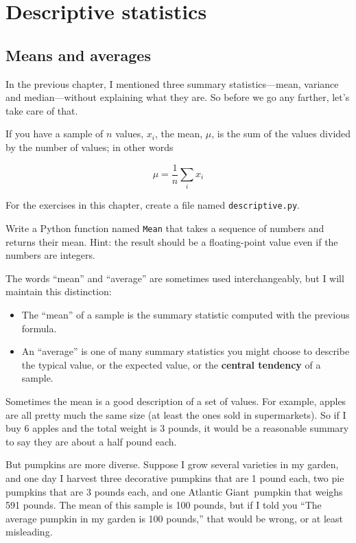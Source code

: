 \documentclass[10pt]{book}
\begin{document}
\chapter{Descriptive statistics}

\section{Means and averages}

In the previous chapter, I mentioned three summary statistics---mean,
variance and median---without explaining what they are.  So before
we go any farther, let's take care of that.

If you have a sample of $n$ values, $x_i$, the mean, $\mu$, is
the sum of the values divided by the number of values; in other words

\[ \mu = \frac{1}{n} \sum_i x_i \]

\begin{ex}
For the exercises in this chapter, create a file named {\tt descriptive.py}.

Write a Python function named {\tt Mean} that takes a sequence 
of numbers and returns their mean.  Hint: the result should
be a floating-point value even if the numbers are integers.
\end{ex}

The words ``mean'' and ``average'' are sometimes used interchangeably,
but I will maintain this distinction:

\begin{itemize}

\item The ``mean'' of a sample is the summary statistic computed with
  the previous formula.

\item An ``average'' is one of many summary statistics you might
  choose to describe the typical value, or the expected value, or the
  {\bf central tendency} of a sample.  

\end{itemize}

Sometimes the mean is a good description of a set of values.  For
example, apples are all pretty much the same size (at least the ones
sold in supermarkets).  So if I buy 6 apples and the total weight is 3
pounds, it would be a reasonable summary to say they are about a half
pound each.

But pumpkins are more diverse.  Suppose I grow several varieties in my
garden, and one day I harvest three decorative pumpkins that are 1
pound each, two pie pumpkins that are 3 pounds each, and one Atlantic
Giant\textregistered~pumpkin that weighs 591 pounds.  The mean of
this sample is 100 pounds, but if I told you ``The average pumpkin
in my garden is 100 pounds,'' that would be wrong, or at least
misleading.
\end{document}

